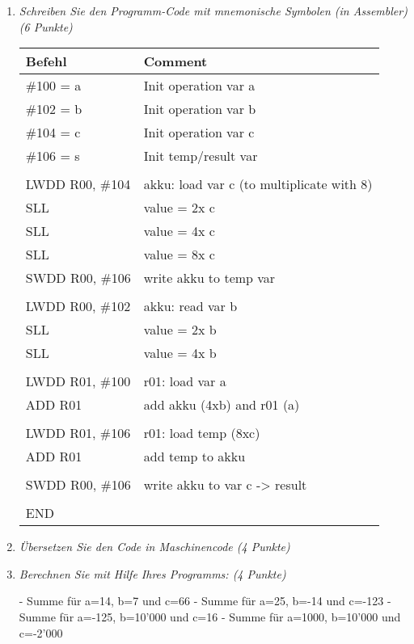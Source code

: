 \documentclass[10pt]{article}
\begin{document}
\begin{enumerate}[label=\alph*)]
	\item
		\textit{Schreiben Sie den Programm-Code mit mnemonische Symbolen (in Assembler) (6 Punkte)}
		
		\begin{tabular}[h]{l | l}
			\textbf{Befehl} & \textbf{Comment}\\
			\hline
			\#100 = a & Init operation var a\\
			\#102 = b & Init operation var b\\
			\#104 = c & Init operation var c\\
			\#106 = s & Init temp/result var \\
			& \\
			LWDD R00, \#104 & akku: load var c (to multiplicate with 8)\\
			SLL & value = 2x c \\ %
			SLL & value = 4x c\\
			SLL & value = 8x c\\
			SWDD R00, \#106 & write akku to temp var\\
			& \\
			LWDD R00, \#102 & akku: read var b \\
			SLL & value = 2x b\\
			SLL & value = 4x b\\
			& \\
			LWDD R01, \#100 & r01: load var a\\ %
			ADD R01 & add akku (4xb) and r01 (a)\\
			& \\
			LWDD R01, \#106	 & r01: load temp (8xc) \\
			ADD R01 & add temp to akku \\
			& \\
			SWDD R00, \#106 & write akku to var c -> result\\
			& \\
			END & \\
			
		\end{tabular}

	\item
			\textit{Übersetzen Sie den Code in Maschinencode (4 Punkte)}
			
			
	\item
			\textit{Berechnen Sie mit Hilfe Ihres Programms: (4 Punkte)}
			
			- Summe für a=14, b=7 und c=66
			- Summe für a=25, b=-14 und c=-123
			- Summe für a=-125, b=10’000 und c=16
			- Summe für a=1000, b=10’000 und c=-2’000
\end{enumerate}
\end{document}

